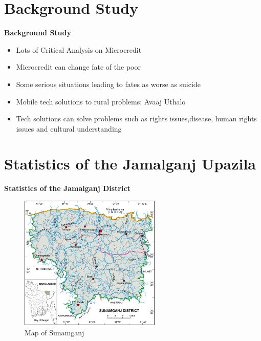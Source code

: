 \documentclass{beamer}
\begin{document}
\section{Background Study}

\begin{frame}
\begin{center}
{\LARGE \textbf{Background Study}}
\end{center}
\end{frame}

\begin{frame}
\begin{itemize}
\item Lots of Critical Analysis on Microcredit
\item Microcredit can change fate of the poor
\item Some serious situations leading to fates as worse as suicide
\item Mobile tech solutions to rural problems: Avaaj Uthalo
\item Tech solutions can solve problems such as rights issues,disease, human rights issues and cultural understanding
\end{itemize}
\end{frame}

\section{Statistics of the Jamalganj Upazila}

\begin{frame}

\begin{center}
{\LARGE \textbf{Statistics of the Jamalganj District}}
\end{center}

\end{frame}


\begin{frame}
\begin{figure}[h]
\centering
\includegraphics[width=0.6\textwidth]{map.png}
\caption{Map of Sunamganj}
\end{figure}
\end{frame}
\end{document}
